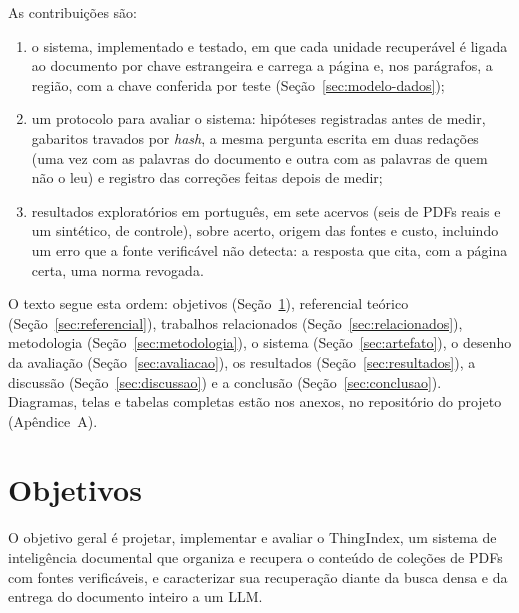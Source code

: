 \documentclass[12pt]{article}
\begin{document}
As contribuições são:
\begin{enumerate}
  \item o sistema, implementado e testado, em que cada unidade recuperável é ligada ao documento por chave estrangeira e carrega a página e, nos parágrafos, a região, com a chave conferida por teste (Seção~\ref{sec:modelo-dados});
  \item um protocolo para avaliar o sistema: hipóteses registradas antes de medir, gabaritos travados por \emph{hash}, a mesma pergunta escrita em duas redações (uma vez com as palavras do documento e outra com as palavras de quem não o leu) e registro das correções feitas depois de medir;
  \item resultados exploratórios em português, em sete acervos (seis de PDFs reais e um sintético, de controle), sobre acerto, origem das fontes e custo, incluindo um erro que a fonte verificável não detecta: a resposta que cita, com a página certa, uma norma revogada.
\end{enumerate}

O texto segue esta ordem: objetivos (Seção~\ref{sec:objetivos}), referencial teórico (Seção~\ref{sec:referencial}), trabalhos relacionados (Seção~\ref{sec:relacionados}), metodologia (Seção~\ref{sec:metodologia}), o sistema (Seção~\ref{sec:artefato}), o desenho da avaliação (Seção~\ref{sec:avaliacao}), os resultados (Seção~\ref{sec:resultados}), a discussão (Seção~\ref{sec:discussao}) e a conclusão (Seção~\ref{sec:conclusao}). Diagramas, telas e tabelas completas estão nos anexos, no repositório do projeto (Apêndice~A).

\section{Objetivos}
\label{sec:objetivos}

O objetivo geral é projetar, implementar e avaliar o ThingIndex, um sistema de inteligência documental que organiza e recupera o conteúdo de coleções de PDFs com fontes verificáveis, e caracterizar sua recuperação diante da busca densa e da entrega do documento inteiro a um LLM.
\end{document}
